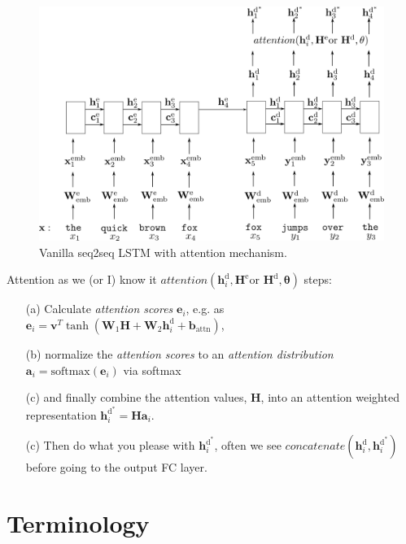 \documentclass{beamer}
\begin{document}
\begin{frame}
\begin{figure}[t]
	\includegraphics[width=\textwidth]{figures/vanilla-attention-big.png}
	\caption{Vanilla seq2seq LSTM with attention mechanism.}
\end{figure}
\end{frame}

\begin{frame}{Attention as we (or I) know it}
	$attention(\mathbf{h}^{\text{d}}_i, \mathbf{H}^{\text{e}} \text{or } \mathbf{H}^{\text{d}}, \mathbf{\theta})$ steps:
	\begin{itemize}
		\item[(a)] Calculate \textit{attention scores} $\mathbf{e}_i$, e.g. as $\mathbf{e}_i = \mathbf{v}^T\tanh(\mathbf{W}_1\mathbf{H} + \mathbf{W}_2 \mathbf{h}^{\text{d}}_i + \mathbf{b}_{\text{attn}})$,
		\item[(b)] normalize the \textit{attention scores} to an \textit{attention distribution} $\mathbf{a}_i = \text{softmax}(\mathbf{e}_i)$ via softmax
		\item[(c)] and finally combine the attention values, $\mathbf{H}$, into an attention weighted representation $\mathbf{h}^{\text{d}^*}_i = \mathbf{H}\mathbf{a}_i$.
		\item[(c)] Then do what you please with $\mathbf{h}^{\text{d}^*}_i$, often we see $concatenate(\mathbf{h}^{\text{d}}_i, \mathbf{h}^{\text{d}^*}_i)$ before going to the output FC layer.
	\end{itemize}
\end{frame}

\section{Terminology}
\end{document}
